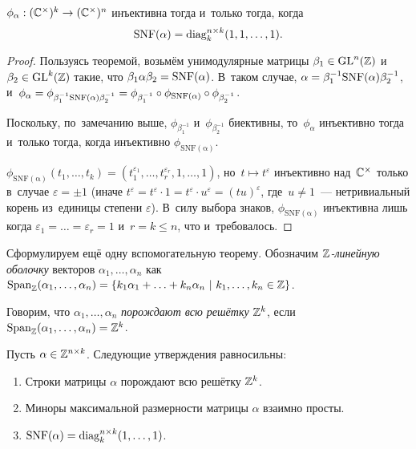 \documentclass{article}
\begin{document}
\begin{lemma*}
    $\phi_\alpha : (\mathbb{C}^\times)^k \rightarrow (\mathbb{C}^\times)^n$ инъективна тогда и~только тогда, когда
    $$
        \mathrm{SNF}(\alpha) = \mathrm{diag}^{n \times k}_k(1, 1, \ldots, 1).
    $$
\end{lemma*}

\begin{proof}
    Пользуясь теоремой, возьмём унимодулярные матрицы $\beta_1 \in \mathrm{GL}^n(\mathbb{Z})$ и~$\beta_2 \in \mathrm{GL}^k(\mathbb{Z})$
    такие, что $\beta_1 \alpha \beta_2 = \mathrm{SNF}(\alpha)$.
    В~таком случае, $\alpha = \beta_1^{-1} \mathrm{SNF}(\alpha) \beta_2^{-1}$, и~$\phi_\alpha = \phi_{\beta_1^{-1} \mathrm{SNF}(\alpha) \beta_2^{-1}}
                                                                                      = \phi_{\beta_1^{-1}} \circ \phi_{\mathrm{SNF}(\alpha)} \circ \phi_{\beta_2^{-1}}$.

    Поскольку, по~замечанию выше, $\phi_{\beta_1^{-1}}$ и~$\phi_{\beta_2^{-1}}$ биективны, то~$\phi_\alpha$
    инъективно тогда и~только тогда, когда инъективно $\phi_{\mathrm{SNF(\alpha)}}$.

    $\phi_{\mathrm{SNF(\alpha)}}(t_1, \ldots, t_k) = (t_1^{\varepsilon_1}, \ldots, t_r^{\varepsilon_r}, 1, \ldots, 1)$,
    но~$t \mapsto t^\varepsilon$ инъективно над~$\mathbb{C}^\times$ только в~случае $\varepsilon = \pm 1$
    (иначе $t^\varepsilon = t^\varepsilon \cdot 1 = t^\varepsilon \cdot u^\varepsilon = (tu)^\varepsilon$,
     где~$u \neq 1$~— нетривиальный корень из~единицы степени $\varepsilon$).
    В~силу выбора знаков, $\phi_{\mathrm{SNF(\alpha)}}$ инъективна лишь когда $\varepsilon_1 = \ldots = \varepsilon_r = 1$
    и~$r = k \leq n$, что и~требовалось.
\end{proof}

Сформулируем ещё одну вспомогательную теорему.
Обозначим \textit{$\mathbb{Z}$-линейную оболочку} векторов $\alpha_1, \ldots, \alpha_n$ как
$\mathrm{Span}_{\mathbb{Z}}(\alpha_1, \ldots, \alpha_n) = \{ k_1 \alpha_1 + \ldots + k_n \alpha_n \ | \ k_1, \ldots, k_n \in \mathbb{Z} \}$.

Говорим, что $\alpha_1, \ldots, \alpha_n$ \textit{порождают всю решётку} $\mathbb{Z}^k$, если $\mathrm{Span}_{\mathbb{Z}}(\alpha_1, \ldots, \alpha_n) = \mathbb{Z}^k$.

\begin{theorem*}
    Пусть $\alpha \in \mathbb{Z}^{n \times k}$. Следующие утверждения равносильны:
    \begin{enumerate}
        \item Строки матрицы $\alpha$ порождают всю решётку $\mathbb{Z}^k$.
        \item Миноры максимальной размерности матрицы $\alpha$ взаимно просты.
        \item $\mathrm{SNF}(\alpha) = \mathrm{diag}^{n \times k}_k(1, \ldots, 1)$.
    \end{enumerate}
\end{theorem*}
\end{document}

